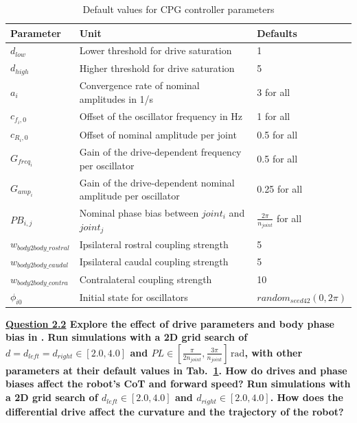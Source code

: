 \documentclass{cmc}
\begin{document}
\begin{table}[H]
\centering


\begin{tabular}{|p{}|p{}|p{}|}
    \hline
    Parameter & Unit & Defaults \\
    \hline
    $d_{low}$ & Lower threshold for drive saturation & 1\\
    $d_{high}$ & Higher threshold for drive saturation & 5\\
    $a_i$ & Convergence rate of nominal amplitudes in 1/s& 3 for all\\
    $c_{f_i,0}$ & Offset of the oscillator frequency in Hz & 1 for all\\
    $c_{R_i,0}$ & Offset of nominal amplitude per joint & 0.5 for all\\
    $G_{freq_i}$ & Gain of the drive-dependent frequency per oscillator & 0.5 for all\\
    $G_{amp_i}$ & Gain of the drive-dependent nominal amplitude per oscillator & 0.25 for all\\
    $PB_{i,j}$ & Nominal phase bias between $joint_i$ and $joint_j$& $\frac{2\pi}{n_{joint}}$ for all\\
    $w_{body2body\_rostral}$ & Ipsilateral rostral coupling strength & 5\\
    $w_{body2body\_caudal}$ & Ipsilateral caudal coupling strength & 5\\
    $w_{body2body\_contra}$ & Contralateral coupling strength & 10\\
    $\phi_{i0}$ & Initial state for oscillators & $random_{seed42}(0, 2\pi)$\\
    \hline
\end{tabular}
\caption{\label{tab:cpg_params}Default values for CPG controller parameters}
\end{table}


\textbf{\underline{Question 2.2} Explore the effect of drive parameters and body phase bias in
. Run simulations
with a 2D grid search of
$d = d_{left} = d_{right} \in [2.0,4.0]$ and
$PL \in [\frac{\pi}{2n_{joint}}, \frac{3\pi}{n_{joint}}]\,\mathrm{rad}$,
with other parameters at their default values in
Tab.~\ref{tab:cpg_params}. How do drives and phase biases affect the
robot's CoT and forward speed? Run simulations with a 2D grid search of
$d_{left} \in [2.0,4.0]$ and $d_{right} \in [2.0,4.0]$. How does the
differential drive affect the curvature and the trajectory of the robot?}
\end{document}
